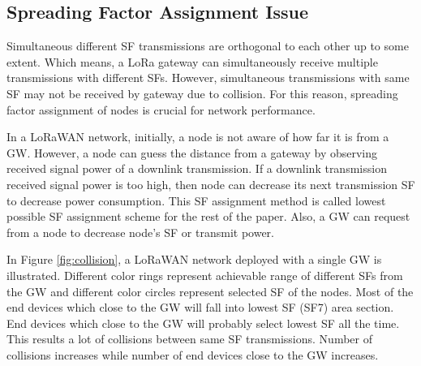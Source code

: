 \documentclass[conference]{IEEEtran}
\begin{document}
\subsection{Spreading Factor Assignment Issue}
\par Simultaneous different SF transmissions are orthogonal to each other up to some extent. Which means, a LoRa gateway can simultaneously receive multiple transmissions with different SFs. However, simultaneous transmissions with same SF may not be received by gateway due to collision. For this reason, spreading factor assignment of nodes is crucial for network performance.

\par In a LoRaWAN network, initially, a node is not aware of how far it is from a GW. However, a node can guess the distance from a gateway by observing received signal power of a downlink transmission. If a downlink transmission received signal power is too high, then node can decrease its next transmission SF to decrease power consumption. This SF assignment method is called lowest possible SF assignment scheme for the rest of the paper. Also, a GW can request from a node to decrease node's SF or transmit power.

\par In Figure \ref{fig:collision}, a LoRaWAN network deployed with a single GW is illustrated. Different color rings represent achievable range of different SFs from the GW and different color circles represent selected SF of the nodes. Most of the end devices which close to the GW will fall into lowest SF (SF7) area section. End devices which close to the GW will probably select lowest SF all the time. This results a lot of collisions between same SF transmissions. Number of collisions increases while number of end devices close to the GW increases.
\end{document}
